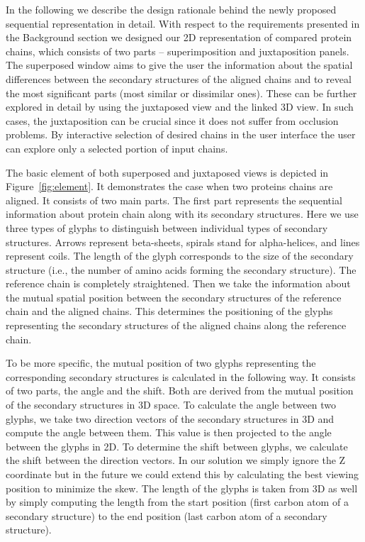 \documentclass[twocolumn]{bmcart}%
\begin{document}
In the following we describe the design rationale behind the newly proposed sequential representation in detail.
With respect to the requirements presented in the Background section we designed our 2D representation of compared protein chains, which consists of two parts -- superimposition and juxtaposition panels.
The superposed window aims to give the user the information about the spatial differences between the secondary structures of the aligned chains and to reveal the most significant parts (most similar or dissimilar ones).
These can be further explored in detail by using the juxtaposed view and the linked 3D view.
In such cases, the juxtaposition can be crucial since it does not suffer from occlusion problems.
By interactive selection of desired chains in the user interface the user can explore only a selected portion of input chains.

The basic element of both superposed and juxtaposed views is depicted in Figure~\ref{fig:element}.
It demonstrates the case when two proteins chains are aligned.
It consists of two main parts.
The first part represents the sequential information about protein chain along with its secondary structures.
Here we use three types of glyphs to distinguish between individual types of secondary structures.
Arrows represent beta-sheets, spirals stand for alpha-helices, and lines represent coils.
The length of the glyph corresponds to the size of the secondary structure (i.e., the number of amino acids forming the secondary structure).
The reference chain is completely straightened.
Then we take the information about the mutual spatial position between the secondary structures of the reference chain and the aligned chains.
This determines the positioning of the glyphs representing the secondary structures of the aligned chains along the reference chain.

To be more specific, the mutual position of two glyphs representing the corresponding secondary structures is calculated in the following way.
It consists of two parts, the angle and the shift.
Both are derived from the mutual position of the secondary structures in 3D space.
To calculate the angle between two glyphs, we take two direction vectors of the secondary structures in 3D and compute the angle between them.
This value is then projected to the angle between the glyphs in 2D.
To determine the shift between glyphs, we calculate the shift between the direction vectors.
In our solution we simply ignore the Z coordinate but in the future we could extend this by calculating the best viewing position to minimize the skew.
The length of the glyphs is taken from 3D as well by simply computing the length from the start position (first carbon atom of a secondary structure) to the end position (last carbon atom of a secondary structure).
\end{document}
